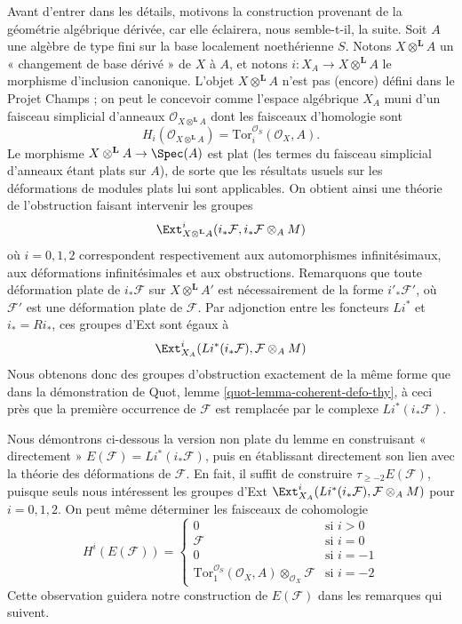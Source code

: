 \medskip\noindent
Avant d'entrer dans les détails, motivons la construction provenant de la
géométrie algébrique dérivée, car elle éclairera, nous semble-t-il, la suite.
Soit $A$ une algèbre de type fini sur la base localement noethérienne $S$.
Notons $X \otimes^\mathbf{L} A$ un « changement de base dérivé » de $X$ à
$A$, et notons $i : X_A \to X \otimes^\mathbf{L} A$ le morphisme d'inclusion
canonique. L'objet $X \otimes^\mathbf{L} A$ n'est pas (encore) défini dans le
Projet Champs ; on peut le concevoir comme l'espace algébrique $X_A$ muni d'un
faisceau simplicial d'anneaux
$\mathcal{O}_{X \otimes^\mathbf{L} A}$ dont les faisceaux d'homologie sont
$$
H_i(\mathcal{O}_{X \otimes^\mathbf{L} A}) =
\text{Tor}^{\mathcal{O}_S}_i(\mathcal{O}_X, A).
$$
Le morphisme $X \otimes^\mathbf{L} A \to \Spec(A)$ est plat
(les termes du faisceau simplicial d'anneaux étant plats sur $A$),
de sorte que les résultats usuels sur les déformations de modules plats lui
sont applicables. On obtient ainsi une théorie de l'obstruction faisant
intervenir les groupes
$$
\Ext^i_{X \otimes^\mathbf{L} A}(i_*\mathcal{F},
i_*\mathcal{F} \otimes_A M)
$$
où $i = 0, 1, 2$ correspondent respectivement aux automorphismes
infinitésimaux, aux déformations infinitésimales et aux obstructions.
Remarquons que toute déformation plate de $i_*\mathcal{F}$ sur
$X \otimes^\mathbf{L} A'$ est nécessairement de la forme
$i'_*\mathcal{F}'$, où $\mathcal{F}'$ est une déformation plate de
$\mathcal{F}$. Par adjonction entre les foncteurs $Li^*$ et
$i_* = Ri_*$, ces groupes d'Ext sont égaux à
$$
\Ext^i_{X_A}(Li^*(i_*\mathcal{F}), \mathcal{F} \otimes_A M)
$$
Nous obtenons donc des groupes d'obstruction exactement de la même forme que
dans la démonstration de Quot, lemme \ref{quot-lemma-coherent-defo-thy},
à ceci près que la première occurrence de $\mathcal{F}$ est remplacée par le
complexe $Li^*(i_*\mathcal{F})$.

\medskip\noindent
Nous démontrons ci-dessous la version non plate du lemme en construisant
« directement » $E(\mathcal{F}) = Li^*(i_*\mathcal{F})$, puis en établissant
directement son lien avec la théorie des déformations de $\mathcal{F}$.
En fait, il suffit de construire $\tau_{\geq -2}E(\mathcal{F})$, puisque seuls
nous intéressent les groupes d'Ext
$\Ext^i_{X_A}(Li^*(i_*\mathcal{F}), \mathcal{F} \otimes_A M)$
pour $i = 0, 1, 2$. On peut même déterminer les faisceaux de cohomologie
$$
H^i(E(\mathcal{F})) =
\left\{
\begin{matrix}
0 & \text{si }i > 0 \\
\mathcal{F} & \text{si } i = 0 \\
0 & \text{si } i = -1 \\
\text{Tor}_1^{\mathcal{O}_S}(\mathcal{O}_X, A)
\otimes_{\mathcal{O}_X} \mathcal{F} &
\text{si } i = -2
\end{matrix}
\right.
$$
Cette observation guidera notre construction de $E(\mathcal{F})$ dans les
remarques qui suivent.

